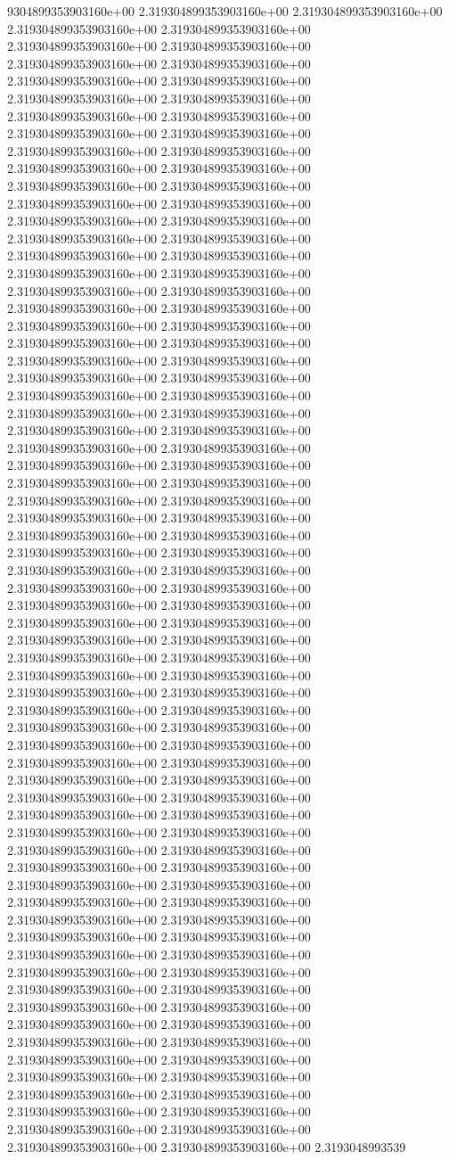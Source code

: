 9304899353903160e+00	2.319304899353903160e+00	2.319304899353903160e+00	2.319304899353903160e+00	2.319304899353903160e+00	2.319304899353903160e+00	2.319304899353903160e+00	2.319304899353903160e+00	2.319304899353903160e+00	2.319304899353903160e+00	2.319304899353903160e+00	2.319304899353903160e+00	2.319304899353903160e+00	2.319304899353903160e+00	2.319304899353903160e+00	2.319304899353903160e+00	2.319304899353903160e+00	2.319304899353903160e+00	2.319304899353903160e+00	2.319304899353903160e+00	2.319304899353903160e+00	2.319304899353903160e+00	2.319304899353903160e+00	2.319304899353903160e+00	2.319304899353903160e+00	2.319304899353903160e+00	2.319304899353903160e+00	2.319304899353903160e+00	2.319304899353903160e+00	2.319304899353903160e+00	2.319304899353903160e+00	2.319304899353903160e+00	2.319304899353903160e+00	2.319304899353903160e+00	2.319304899353903160e+00	2.319304899353903160e+00	2.319304899353903160e+00	2.319304899353903160e+00	2.319304899353903160e+00	2.319304899353903160e+00	2.319304899353903160e+00	2.319304899353903160e+00	2.319304899353903160e+00	2.319304899353903160e+00	2.319304899353903160e+00	2.319304899353903160e+00	2.319304899353903160e+00	2.319304899353903160e+00	2.319304899353903160e+00	2.319304899353903160e+00	2.319304899353903160e+00	2.319304899353903160e+00	2.319304899353903160e+00	2.319304899353903160e+00	2.319304899353903160e+00	2.319304899353903160e+00	2.319304899353903160e+00	2.319304899353903160e+00	2.319304899353903160e+00	2.319304899353903160e+00	2.319304899353903160e+00	2.319304899353903160e+00	2.319304899353903160e+00	2.319304899353903160e+00	2.319304899353903160e+00	2.319304899353903160e+00	2.319304899353903160e+00	2.319304899353903160e+00	2.319304899353903160e+00	2.319304899353903160e+00	2.319304899353903160e+00	2.319304899353903160e+00	2.319304899353903160e+00	2.319304899353903160e+00	2.319304899353903160e+00	2.319304899353903160e+00	2.319304899353903160e+00	2.319304899353903160e+00	2.319304899353903160e+00	2.319304899353903160e+00	2.319304899353903160e+00	2.319304899353903160e+00	2.319304899353903160e+00	2.319304899353903160e+00	2.319304899353903160e+00	2.319304899353903160e+00	2.319304899353903160e+00	2.319304899353903160e+00	2.319304899353903160e+00	2.319304899353903160e+00	2.319304899353903160e+00	2.319304899353903160e+00	2.319304899353903160e+00	2.319304899353903160e+00	2.319304899353903160e+00	2.319304899353903160e+00	2.319304899353903160e+00	2.319304899353903160e+00	2.319304899353903160e+00	2.319304899353903160e+00	2.319304899353903160e+00	2.319304899353903160e+00	2.319304899353903160e+00	2.319304899353903160e+00	2.319304899353903160e+00	2.319304899353903160e+00	2.319304899353903160e+00	2.319304899353903160e+00	2.319304899353903160e+00	2.319304899353903160e+00	2.319304899353903160e+00	2.319304899353903160e+00	2.319304899353903160e+00	2.319304899353903160e+00	2.319304899353903160e+00	2.319304899353903160e+00	2.319304899353903160e+00	2.319304899353903160e+00	2.319304899353903160e+00	2.319304899353903160e+00	2.319304899353903160e+00	2.319304899353903160e+00	2.319304899353903160e+00	2.319304899353903160e+00	2.319304899353903160e+00	2.319304899353903160e+00	2.319304899353903160e+00	2.319304899353903160e+00	2.319304899353903160e+00	2.319304899353903160e+00	2.319304899353903160e+00	2.319304899353903160e+00	2.319304899353903160e+00	2.3193048993539